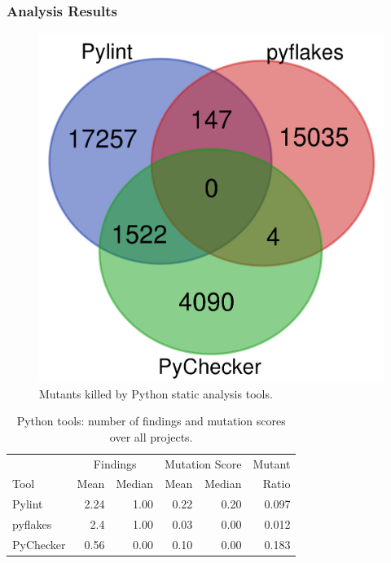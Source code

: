 \subsubsection{Analysis Results}


\begin{figure}
  \includegraphics[width=\columnwidth]{python.png}
  \caption{Mutants killed by Python static analysis tools.}
  \label{fig:pythonvenn}
\end{figure}

\begin{table}
  \begin{tabular}{l|r|r|r|r|r}
    & \multicolumn{2}{|c|}{Findings} & \multicolumn{2}{|c|}{Mutation Score}  & Mutant \\
    Tool & Mean & Median & Mean & Median & Ratio\\
    \hline
    \hline
    Pylint & 2.24 & 1.00 & 0.22 & 0.20 & 0.097 \\
    \hline
    pyflakes & 2.4 & 1.00 & 0.03 & 0.00 & 0.012 \\
    \hline
    PyChecker & 0.56& 0.00 & 0.10 & 0.00 &  0.183 \\
    \hline
  \end{tabular}
  \caption{Python tools: number of findings and mutation scores over all projects.}
  \label{tab:scorepython}
\end{table}

